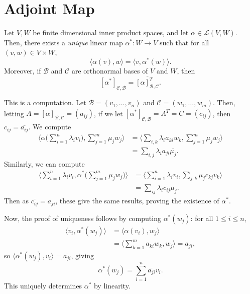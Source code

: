 \documentclass[12pt]{article}
\begin{document}
\newpage

\section{Adjoint Map}
\label{sec:adjoint_map}

\begin{definition}
	Let $V, W$ be finite dimensional inner product spaces, and let $\alpha \in \mathcal{L}(V, W)$. Then, there exists a \emph{unique} linear map $\alpha^{\ast} : W \to V$ such that for all $(v, w) \in V \times W$,
	\[
	\langle \alpha(v), w \rangle = \langle v, \alpha^{\ast}(w) \rangle
	.\]
	Moreover, if $\mathcal{B}$ and $\mathcal{C}$ are orthonormal bases of $V$ and $W$, then
	\[
		[\alpha^{\ast}]_{\mathcal{C},\mathcal{B}} = \overline{[\alpha]_{\mathcal{B},\mathcal{C}}^{T}}
	.\]
\end{definition}

\begin{proofbox}
	This is a computation. Let $\mathcal{B} = (v_1, \ldots, v_n)$ and $\mathcal{C} = (w_1, \ldots, w_m)$. Then, letting $A = [\alpha]_{\mathcal{B},\mathcal{C}} = (a_{ij})$, if we let $[\alpha^{\ast}]_{\mathcal{C},\mathcal{B}} = \overline{A^{T}} = C = (c_{ij})$, then $c_{ij} = \overline{a_{ij}}$. We compute
	\begin{align*}
		\biggl\langle \alpha \biggl( \sum_{i=1}^{n} \lambda_i v_i \biggr), \sum_{j=1}^{m} \mu_j w_j \biggr\rangle &= \biggl \langle \sum_{i,k} \lambda_i a_{ki} w_k, \sum_{j = 1}^{m} \mu_j w_j \biggr \rangle \\
															  &= \sum_{i,j} \lambda_i a_{ji} \overline{\mu_j}.
	\end{align*}
	Similarly, we can compute
	\begin{align*}
	\biggl\langle \sum_{i = 1}^{n} \lambda_i v_i, \alpha^{\ast} \biggl( \sum_{j = 1}^{m} \mu_j w_j \biggr) \biggr \rangle &= \biggl \langle \sum_{i=1}^{n} \lambda_i v_i, \sum_{j, k} \mu_j c_{kj} v_k \biggr \rangle \\
															      &= \sum_{ij} \lambda_i \overline{c_{ij}} \overline{\mu_j}.
	\end{align*}
	Then as $\overline{c_{ij}} = a_{ji}$, these give the same results, proving the existence of $\alpha^{\ast}$.

	Now, the proof of uniqueness follows by computing $\alpha^{\ast}(w_j)$: for all $1 \leq i \leq n$,
	\begin{align*}
		\langle v_i, \alpha^{\ast}(w_j) \rangle &= \langle \alpha(v_i), w_j \rangle \\
							&= \biggl \langle \sum_{k = 1}^{m} a_{ki}w_k, w_j \biggr \rangle = a_{ji},
	\end{align*}
	so  $\langle \alpha^{\ast}(w_j), v_i \rangle = \overline{a_{ji}}$, giving
	\[
	\alpha^{\ast}(w_j) = \sum_{i = 1}^{n} \overline{a_{ji}} v_i
	.\]
	This uniquely determines $\alpha^{\ast}$ by linearity.
\end{proofbox}
\end{document}

